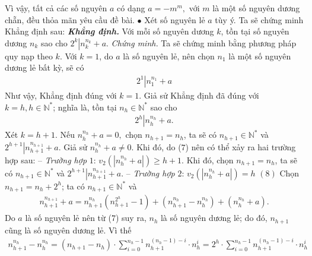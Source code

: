 \begin{multicols}{2}
	\vskip 0.05cm 
	Vì vậy, tất cả các số nguyên $a$ có dạng $a =  - {m^m},$  với $m$ là một số nguyên dương chẵn, đều thỏa mãn yêu cầu đề bài.
	\vskip 0.05cm
	$\bullet$ Xét số nguyên lẻ $a$ tùy ý.
	\vskip 0.05cm
	Ta sẽ chứng minh Khẳng định sau:
	\vskip 0.05cm
	\textbf{\textit{Khẳng định.}} Với mỗi số nguyên dương $k$, tồn tại số nguyên dương  $n_k$ sao cho ${2^k}\left| {n_k^{{n_k}} + a} \right..$
	\vskip 0.05cm 
	\textit{Chứng minh.} Ta sẽ chứng minh bằng phương pháp quy nạp theo $k$.
	\vskip 0.05cm
	Với $k = 1$, do $a$ là số nguyên lẻ, nên chọn $n_1$  là một số nguyên dương lẻ bất kỳ, sẽ có
	\begin{align*}
		{2^1}\left| {n_1^{{n_1}} + a} \right.
	\end{align*}
	Như vậy, Khẳng định đúng với $k = 1$.
	\vskip 0.05cm
	Giả sử Khẳng định đã đúng với $k = h, h \in \mathbb{N^*}$;  nghĩa là, tồn tại $n_h \in\mathbb{N^*}$  sao cho
	\begin{align*}
		{2^h}\left| {n_h^{{n_h}} + a} \right.. \tag{$7$}
	\end{align*}
	Xét $k = h + 1$.
	\vskip 0.05cm
	Nếu $n_h^{{n_h}} + a = 0,$  chọn  ${n_{h + 1}} = {n_h}$, ta sẽ có ${n_{h + 1}} \in \mathbb{N^*}$  và  ${2^{h + 1}}\left| {n_{h + 1}^{{n_{h + 1}}} + a} \right.$.
	\vskip 0.05cm
	Giả sử $n_h^{{n_h}} + a \ne 0.$  Khi đó, do ($7$) nên có thể xảy ra hai trường hợp sau:
	\vskip 0.05cm
	-- \textit{Trường hợp} $1$: ${v_2}\left( {\left| {n_h^{{n_h}} + a} \right|} \right) \ge h + 1.$
	\vskip 0.05cm  
	Khi đó, chọn  ${n_{h + 1}} = {n_h}$, ta sẽ có ${n_{h + 1}} \in \mathbb{N^*}$   và  ${2^{h + 1}}\left| {n_{h + 1}^{{n_{h + 1}}} + a} \right.$.
	\vskip 0.05cm
	-- \textit{Trường hợp} $2$:  ${v_2}\left( {\left| {n_h^{{n_h}} + a} \right|} \right) = h$                                                                                                        \hfill $(8)$
	\vskip 0.05cm
	Chọn  ${n_{h + 1}} = {n_h} + {2^h}$; ta có  ${n_{h + 1}} \in \mathbb{N^*}$  và
	\begin{align*}
		n_{h + 1}^{{n_{h + 1}}} + a = n_{h + 1}^{{n_h}}\left( {n_{h + 1}^{{2^h}} - 1} \right) + \left( {n_{h + 1}^{{n_h}} - n_h^{{n_h}}} \right) + \left( {n_h^{{n_h}} + a} \right). \tag{$9$}
	\end{align*}
	Do $a$ là số nguyên lẻ nên từ ($7$) suy ra, $n_h$  là số nguyên dương lẻ; do đó, $n_{h+1}$  cũng là số nguyên dương lẻ. Vì thế
	\begin{align*}
		n_{h + 1}^{{n_h}} - n_h^{{n_h}} = \left( {{n_{h + 1}} - {n_h}} \right) \cdot \sum\limits_{i = 0}^{{n_h} - 1} {n_{h + 1}^{\left( {{n_h} - 1} \right) - i} \cdot n_h^i}  = {2^h} \cdot \sum\limits_{i = 0}^{{n_h} - 1} {n_{h + 1}^{\left( {{n_h} - 1} \right) - i} \cdot n_h^i}

\end{align*}
\end{multicols}
